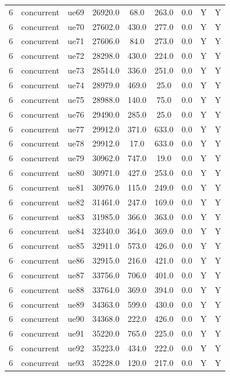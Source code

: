 \begin{table}[ht]
\begin{tabular}{|c|c|c|c|c|c|c|c|c|}
6 & concurrent & ue69 & 26920.0 & 68.0 & 263.0 & 0.0 & Y & Y \\
6 & concurrent & ue70 & 27602.0 & 430.0 & 277.0 & 0.0 & Y & Y \\
6 & concurrent & ue71 & 27606.0 & 84.0 & 273.0 & 0.0 & Y & Y \\
6 & concurrent & ue72 & 28298.0 & 430.0 & 224.0 & 0.0 & Y & Y \\
6 & concurrent & ue73 & 28514.0 & 336.0 & 251.0 & 0.0 & Y & Y \\
6 & concurrent & ue74 & 28979.0 & 469.0 & 25.0 & 0.0 & Y & Y \\
6 & concurrent & ue75 & 28988.0 & 140.0 & 75.0 & 0.0 & Y & Y \\
6 & concurrent & ue76 & 29490.0 & 285.0 & 25.0 & 0.0 & Y & Y \\
6 & concurrent & ue77 & 29912.0 & 371.0 & 633.0 & 0.0 & Y & Y \\
6 & concurrent & ue78 & 29912.0 & 17.0 & 633.0 & 0.0 & Y & Y \\
6 & concurrent & ue79 & 30962.0 & 747.0 & 19.0 & 0.0 & Y & Y \\
6 & concurrent & ue80 & 30971.0 & 427.0 & 253.0 & 0.0 & Y & Y \\
6 & concurrent & ue81 & 30976.0 & 115.0 & 249.0 & 0.0 & Y & Y \\
6 & concurrent & ue82 & 31461.0 & 247.0 & 169.0 & 0.0 & Y & Y \\
6 & concurrent & ue83 & 31985.0 & 366.0 & 363.0 & 0.0 & Y & Y \\
6 & concurrent & ue84 & 32340.0 & 364.0 & 369.0 & 0.0 & Y & Y \\
6 & concurrent & ue85 & 32911.0 & 573.0 & 426.0 & 0.0 & Y & Y \\
6 & concurrent & ue86 & 32915.0 & 216.0 & 421.0 & 0.0 & Y & Y \\
6 & concurrent & ue87 & 33756.0 & 706.0 & 401.0 & 0.0 & Y & Y \\
6 & concurrent & ue88 & 33764.0 & 369.0 & 394.0 & 0.0 & Y & Y \\
6 & concurrent & ue89 & 34363.0 & 599.0 & 430.0 & 0.0 & Y & Y \\
6 & concurrent & ue90 & 34368.0 & 222.0 & 426.0 & 0.0 & Y & Y \\
6 & concurrent & ue91 & 35220.0 & 765.0 & 225.0 & 0.0 & Y & Y \\
6 & concurrent & ue92 & 35223.0 & 434.0 & 222.0 & 0.0 & Y & Y \\
6 & concurrent & ue93 & 35228.0 & 120.0 & 217.0 & 0.0 & Y & Y \\

\end{tabular}
\end{table}
